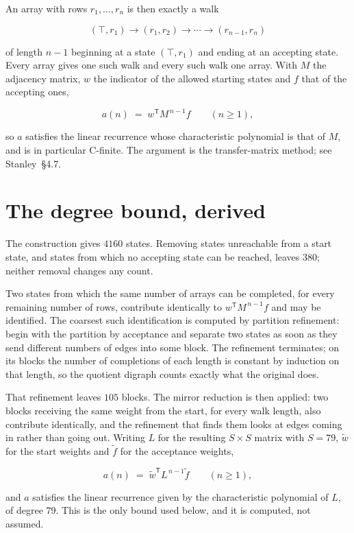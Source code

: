 \documentclass[11pt]{article}
\theoremstyle{definition}
\begin{document}
An array with rows $r_1,\dots,r_n$ is then exactly a walk

\[(\top,r_1) \to (r_1,r_2) \to \cdots \to (r_{n-1},r_n)\]

of length $n-1$ beginning at a state $(\top,r_1)$ and ending at an accepting state. Every array gives one such walk and every such walk one array. With $M$ the adjacency matrix, $w$ the indicator of the allowed starting states and $f$ that of the accepting ones,

\[a(n) \;=\; w^{\mathsf T} M^{\,n-1} f \qquad (n \ge 1),\]

so $a$ satisfies the linear recurrence whose characteristic polynomial is that of $M$, and is in particular C-finite. The argument is the transfer-matrix method; see Stanley~\S4.7.

\section{The degree bound, derived}

The construction gives $4160$ states. Removing states unreachable from a start state, and states from which no accepting state can be reached, leaves $380$; neither removal changes any count.

Two states from which the same number of arrays can be completed, for every remaining number of rows, contribute identically to $w^{\mathsf T}M^{\,n-1}f$ and may be identified. The coarsest such identification is computed by partition refinement: begin with the partition by acceptance and separate two states as soon as they send different numbers of edges into some block. The refinement terminates; on its blocks the number of completions of each length is constant by induction on that length, so the quotient digraph counts exactly what the original does.

That refinement leaves $105$ blocks. The mirror reduction is then applied: two blocks receiving the same weight from the start, for every walk length, also contribute identically, and the refinement that finds them looks at edges coming in rather than going out. Writing $L$ for the resulting $S \times S$ matrix with $S = 79$, $\tilde w$ for the start weights and $\tilde f$ for the acceptance weights,

\[a(n) \;=\; \tilde w^{\mathsf T} L^{\,n-1} \tilde f \qquad (n \ge 1),\]

and $a$ satisfies the linear recurrence given by the characteristic polynomial of $L$, of degree $79$. This is the only bound used below, and it is computed, not assumed.
\end{document}
